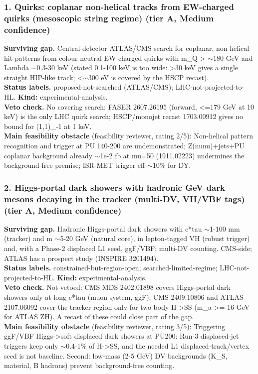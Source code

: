\documentclass[11pt,a4paper]{article}
\begin{document}
\subsubsection*{1. Quirks: coplanar non-helical tracks from EW-charged quirks (mesoscopic string regime) (tier A, Medium confidence)}
\textbf{Surviving gap.} Central-detector ATLAS/CMS search for coplanar, non-helical hit patterns from colour-neutral EW-charged quirks with m\_Q > $\sim$180 GeV and Lambda $\sim$0.3-30 keV (stated 0.1-100 keV is too wide: >30 keV gives a single straight HIP-like track; <$\sim$300 eV is covered by the HSCP recast).\\
\textbf{Status labels.} proposed-not-searched (ATLAS/CMS); LHC-not-projected-to-HL. \textbf{Kind:} experimental-analysis.\\
\textbf{Veto check.} No covering search: FASER 2607.26195 (forward, <=179 GeV at 10 keV) is the only LHC quirk search; HSCP/monojet recast 1703.00912 gives no bound for (1,1)\_-1 at 1 keV.
\\\textbf{Main feasibility obstacle} (feasibility reviewer, rating 2/5): Non-helical pattern recognition and trigger at PU 140-200 are undemonstrated; Z(nunu)+jets+PU coplanar background already $\sim$1e-2 fb at mu=50 (1911.02223) undermines the background-free premise; ISR-MET trigger eff $\sim$10\% for DY.

\subsubsection*{2. Higgs-portal dark showers with hadronic GeV dark mesons decaying in the tracker (multi-DV, VH/VBF tags) (tier A, Medium confidence)}
\textbf{Surviving gap.} Hadronic Higgs-portal dark showers with c*tau $\sim$1-100 mm (tracker) and m $\sim$5-20 GeV (natural core), in lepton-tagged VH (robust trigger) and, with a Phase-2 displaced L1 seed, ggF/VBF; multi-DV counting. CMS-side; ATLAS has a prospect study (INSPIRE 3201494).\\
\textbf{Status labels.} constrained-but-region-open; searched-limited-regime; LHC-not-projected-to-HL. \textbf{Kind:} experimental-analysis.\\
\textbf{Veto check.} Not vetoed: CMS MDS 2402.01898 covers Higgs-portal dark showers only at long c*tau (muon system, ggF); CMS 2409.10806 and ATLAS 2107.06092 cover the tracker region only for two-body H->SS (m\_a >= 16 GeV for ATLAS ZH). A recast of these could close part of the gap.
\\\textbf{Main feasibility obstacle} (feasibility reviewer, rating 3/5): Triggering ggF/VBF Higgs->soft displaced dark showers at PU200: Run-3 displaced-jet triggers keep only $\sim$0.4-1\% of H->SS, and the needed L1 displaced-track/vertex seed is not baseline. Second: low-mass (2-5 GeV) DV backgrounds (K\_S, material, B hadrons) prevent background-free counting.
\end{document}
